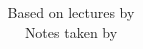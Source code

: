 \newcommand{\st}{\text{ s.t. }}
\newcommand{\tand}{\quad \text{and} \quad}
\newcommand{\tor}{\quad \text{or} \quad}
\newcommand{\stand}{\text{ and }}
\newcommand{\stor}{\text{ or }}
\renewcommand{\tt}[1]{\textnormal{\textbf{(#1).}}} %

\title{\textbf{\ncourse}}
\author{Based on lectures by \nlecturer \\\small Notes taken by \nauthor}
\date{\nterm\ \nyear}
\makeatother
